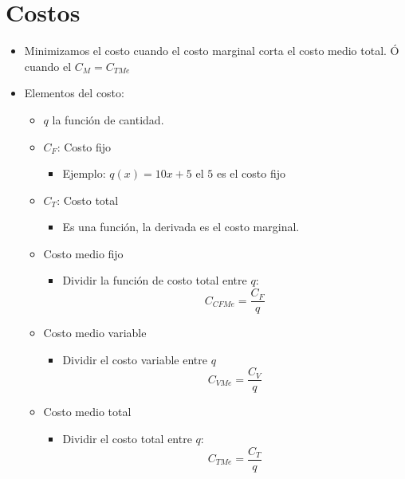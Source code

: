 \section{Costos}
\begin{itemize}
    \item Minimizamos el costo cuando el costo marginal corta el costo medio total. Ó cuando el $C_M = C_{TMe}$ 
    \item Elementos del costo:
        \begin{itemize}
            \item $q$ la función de cantidad.
            
            \item $C_F$: Costo fijo 
                \begin{itemize}
                    \item Ejemplo: $q(x) = 10x + 5$ el $5$ es el costo fijo
                \end{itemize}
            
            \item $C_T$: Costo total
                \begin{itemize}
                    \item Es una función, la derivada es el costo marginal. 
                \end{itemize}
            
            \item Costo medio fijo 
                \begin{itemize}
                    \item Dividir la función de costo total entre $q$:
                        \[
                          C_{CFMe} = \frac{C_F}{q} 
                        \]
                \end{itemize}
            
            \item Costo medio variable 
                \begin{itemize}
                    \item Dividir el costo variable entre $q$
                        \[
                          C_{VMe} = \frac{C_V }{q} 
                        \]
                \end{itemize}
            
            \item Costo medio total 
                \begin{itemize}
                    \item Dividir el costo total entre $q$:
                        \[
                            C_{TMe} = \frac{C_T}{q} 
                        \]
                \end{itemize}
            

\end{itemize}
\end{itemize}
